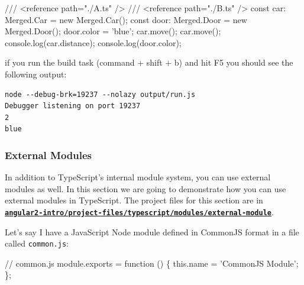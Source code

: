 \documentclass[12pt,]{article}
\newenvironment{Shaded}{}{}
\newcommand{\KeywordTok}[1]{\textcolor[rgb]{0.00,0.00,1.00}{{#1}}}
\newcommand{\DataTypeTok}[1]{{#1}}
\newcommand{\StringTok}[1]{\textcolor[rgb]{0.00,0.50,0.50}{{#1}}}
\newcommand{\CommentTok}[1]{\textcolor[rgb]{0.00,0.50,0.00}{{#1}}}
\newcommand{\FunctionTok}[1]{{#1}}
\newcommand{\VariableTok}[1]{{#1}}
\newcommand{\OperatorTok}[1]{{#1}}
\newcommand{\AttributeTok}[1]{{#1}}
\newcommand{\NormalTok}[1]{{#1}}
\begin{document}
\begin{Shaded}
\begin{Highlighting}[numbers=left,,]
\CommentTok{/// <reference path="./A.ts" />}
\CommentTok{/// <reference path="./B.ts" />}
\DataTypeTok{const} \NormalTok{car: Merged.}\FunctionTok{Car} \NormalTok{= }\KeywordTok{new} \NormalTok{Merged.}\FunctionTok{Car}\NormalTok{();}
\DataTypeTok{const} \NormalTok{door: Merged.}\FunctionTok{Door} \NormalTok{= }\KeywordTok{new} \NormalTok{Merged.}\FunctionTok{Door}\NormalTok{();}
\NormalTok{door.}\FunctionTok{color} \NormalTok{= 'blue';}
\NormalTok{car.}\FunctionTok{move}\NormalTok{();}
\NormalTok{car.}\FunctionTok{move}\NormalTok{();}
\NormalTok{console.}\FunctionTok{log}\NormalTok{(car.}\FunctionTok{distance}\NormalTok{);}
\NormalTok{console.}\FunctionTok{log}\NormalTok{(door.}\FunctionTok{color}\NormalTok{);}
\end{Highlighting}
\end{Shaded}

if you run the build task (command + shift + b) and hit F5 you should
see the following output:

\begin{verbatim}
node --debug-brk=19237 --nolazy output/run.js
Debugger listening on port 19237
2
blue
\end{verbatim}

\subsubsection{External Modules}\label{external-modules}

In addition to TypeScript's internal module system, you can use external
modules as well. In this section we are going to demonstrate how you can
use external modules in TypeScript. The project files for this section
are in
\href{https://github.com/aminmeyghani/angular2-intro/tree/master/project-files/typescript/modules/external-module}{\textbf{\texttt{angular2-intro/project-files/typescript/modules/external-module}}}.

Let's say I have a JavaScript Node module defined in CommonJS format in
a file called \texttt{common.js}:

\begin{Shaded}
\begin{Highlighting}[numbers=left,,]
\CommentTok{// common.js}
\VariableTok{module}\NormalTok{.}\AttributeTok{exports} \OperatorTok{=} \KeywordTok{function} \NormalTok{() }\OperatorTok{\{}
  \KeywordTok{this}\NormalTok{.}\AttributeTok{name} \OperatorTok{=} \StringTok{'CommonJS Module'}\OperatorTok{;}
\OperatorTok{\};}
\end{Highlighting}
\end{Shaded}
\end{document}
